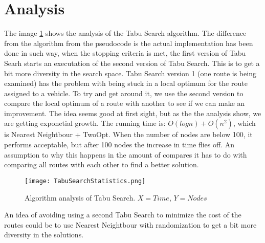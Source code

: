 \documentclass[12pt]{article}
\begin{document}
\newpage

\section{Analysis}
The image \ref{Performance by Tabu Search} shows the analysis of the Tabu Search algorithm. The difference from the algorithm from the pseudocode is the actual implementation has been done in such way, when the stopping criteria is met, the first version of Tabu Searh starts an executation of the second version of Tabu Search. This is to get a bit more diversity in the search space. Tabu Search version 1 (one route is being examined) has the problem with being stuck in a local optimum for the route assigned to a vehicle. To try and get around it, we use the second version to compare the local optimum of a route with another to see if we can make an improvement. 
\newline
The idea seems good at first sight, but as the the analysis show, we are getting exponetial growth. The running time is: $O(log n) + O(n^2)$, which is Nearest Neightbour + TwoOpt. When the number of nodes are below 100, it performs acceptable, but after 100 nodes the increase in time flies off. An assumption to why this happens in the amount of compares it has to do with comparing all routes with each other to find a better solution. 
\begin{figure}[H]
	\caption{Algorithm analysis of Tabu Search. $X = Time$, $Y = Nodes$}
	\centering
	\label{Performance by Tabu Search}
	\texttt{[image: TabuSearchStatistics.png]}
\end{figure}

An idea of avoiding using a second Tabu Search to minimize the cost of the routes could be to use Nearest Neightbour with randomization to get a bit more diversity in the solutions. 
\end{document}
